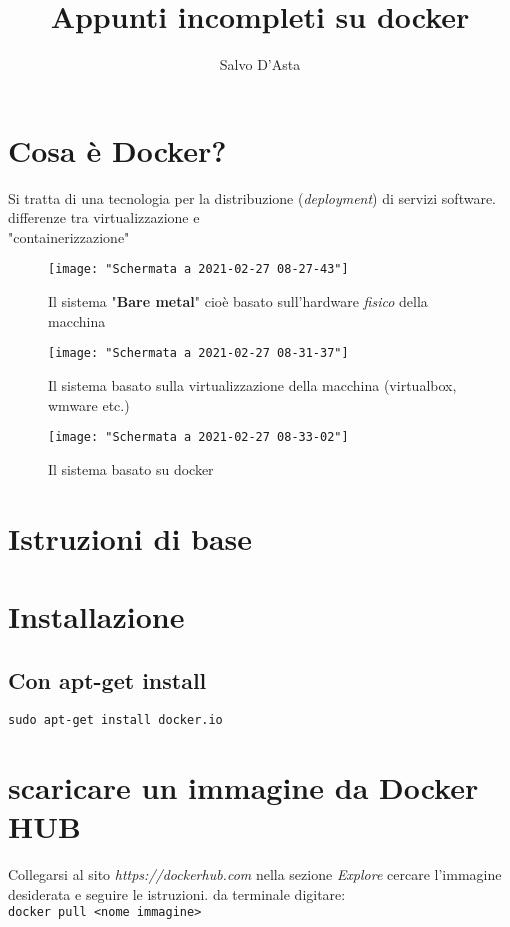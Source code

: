 \documentclass[10pt,a4paper]{report}
\author{Salvo D'Asta}
\title{Appunti incompleti su docker}
\begin{document}
	
	\maketitle
\tableofcontents
\section*{Cosa è Docker?}
Si tratta di una tecnologia per la distribuzione (\textit{deployment}) di servizi software.
differenze tra virtualizzazione e\\ "containerizzazione"
\begin{figure}[h]
	\centering
	\texttt{[image: "Schermata a 2021-02-27 08-27-43"]}
	\caption{Il sistema "\textbf{Bare metal}" cioè basato sull'hardware \textit{fisico} della macchina}
	\label{fig:schermata-a-2021-02-27-08-27-43}
\end{figure}
\begin{figure}[h]
	\centering
	\texttt{[image: "Schermata a 2021-02-27 08-31-37"]}
	\caption{Il sistema basato sulla virtualizzazione della macchina (virtualbox, wmware etc.)}
	\label{fig:schermata-a-2021-02-27-08-31-37}
\end{figure}
\begin{figure}[h]
	\centering
	\texttt{[image: "Schermata a 2021-02-27 08-33-02"]}
	\caption{Il sistema basato su docker}
	\label{fig:schermata-a-2021-02-27-08-33-02}
\end{figure}





  
\section*{Istruzioni di base}	

	\section{Installazione}
	\subsection{Con apt-get install}
	
	\verb|sudo apt-get install docker.io|
	\section{scaricare un immagine da Docker HUB}
	Collegarsi al sito \textit{https://dockerhub.com} 
	nella sezione \textit{Explore} cercare l'immagine desiderata  e seguire le istruzioni.
	da terminale digitare:\\
	\verb|docker pull <nome immagine>|
\end{document}
